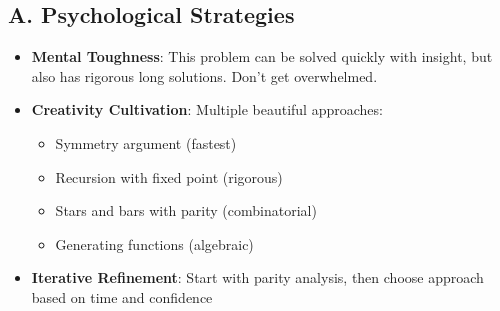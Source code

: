 \documentclass[12pt]{article}
\begin{document}
\begin{strategicbox}
\subsection*{A. Psychological Strategies}
\begin{itemize}[leftmargin=*]
    \item \textbf{Mental Toughness}: This problem can be solved quickly with insight, but also has rigorous long solutions. Don't get overwhelmed.
    \item \textbf{Creativity Cultivation}: Multiple beautiful approaches:
    \begin{itemize}
        \item Symmetry argument (fastest)
        \item Recursion with fixed point (rigorous)
        \item Stars and bars with parity (combinatorial)
        \item Generating functions (algebraic)
    \end{itemize}
    \item \textbf{Iterative Refinement}: Start with parity analysis, then choose approach based on time and confidence
\end{itemize}


\end{strategicbox}
\end{document}
